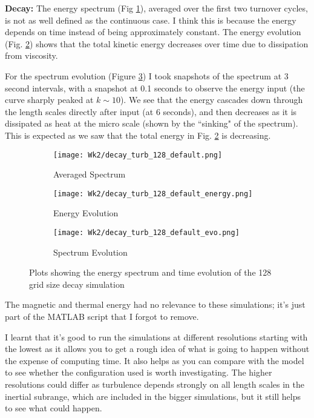 \documentclass[12pt,letterpaper]{article}
\begin{document}
  \textbf{Decay:} The energy spectrum (Fig \ref{fig:128decayspec}), averaged over the first two turnover cycles, is not as well defined as the continuous case. I think this is because the energy depends on time instead of being approximately constant. The energy evolution (Fig. \ref{fig:128decayeng}) shows that the total kinetic energy decreases over time due to dissipation from viscosity.

  For the spectrum evolution (Figure \ref{fig:128decayevo}) I took snapshots of the spectrum at 3 second intervals, with a snapshot at 0.1 seconds to observe the energy input (the curve sharply peaked at $k \sim 10$). We see that the energy cascades down through the length scales directly after input (at 6 seconds), and then decreases as it is dissipated as heat at the micro scale (shown by the ``sinking" of the spectrum). This is expected as we saw that the total energy in Fig. \ref{fig:128decayeng} is decreasing.

  \begin{figure}[h]
   \centering
  \begin{subfigure}{0.5\textwidth}
  \centering
  \texttt{[image: Wk2/decay\_turb\_128\_default.png]}
  \caption{Averaged Spectrum}
  \label{fig:128decayspec}
  \end{subfigure}
  \begin{subfigure}{0.5\textwidth}
  \centering
  \texttt{[image: Wk2/decay\_turb\_128\_default\_energy.png]}
  \caption{Energy Evolution}
  \label{fig:128decayeng}
  \end{subfigure}
  \begin{subfigure}{0.5\textwidth}
  \centering
  \texttt{[image: Wk2/decay\_turb\_128\_default\_evo.png]}
  \caption{Spectrum Evolution}
  \label{fig:128decayevo}
  \end{subfigure}

  \caption{Plots showing the energy spectrum and time evolution of the 128 grid size decay simulation}
  \label{fig:128decayenergy}
  \end{figure}

  The magnetic and thermal energy had no relevance to these simulations; it's just part of the MATLAB script that I forgot to remove.

  I learnt that it's good to run the simulations at different resolutions starting with the lowest as it allows you to get a rough idea of what is going to happen without the expense of computing time. It also helps as you can compare with the model to see whether the configuration used is worth investigating. The higher resolutions could differ as turbulence depends strongly on all length scales in the inertial subrange, which are included in the bigger simulations, but it still helps to see what could happen.
\end{document}
